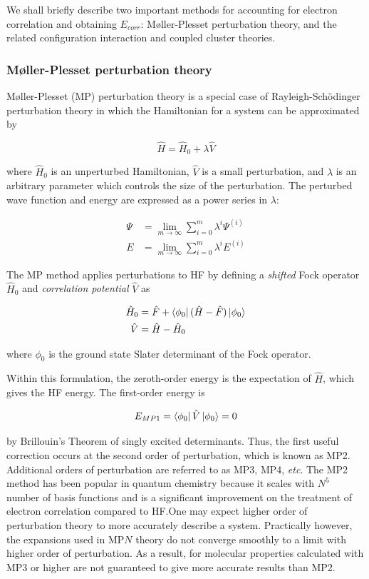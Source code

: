 We shall briefly describe two important methods for accounting for electron correlation and obtaining $E_{corr}$: M{\o}ller-Plesset perturbation theory, and the related configuration interaction and coupled cluster theories.

\subsubsection{M{\o}ller-Plesset perturbation theory}

M{\o}ller-Plesset (MP) perturbation theory is a special case of Rayleigh-Sch{\"o}dinger perturbation theory in which the Hamiltonian for a system can be approximated by

\begin{equation}
  \hat{H} = \hat{H}_0 + \lambda\hat{V}
\end{equation}

\noindent where $\hat{H}_0$ is an unperturbed Hamiltonian, $\hat{V}$ is a small perturbation, and $\lambda$ is an arbitrary parameter which controls the size of the perturbation. The perturbed wave function and energy are expressed as a power series in $\lambda$:

\begin{align}
 \Psi &= \lim_{m\to\infty} \sum_{i=0}^{m} \lambda^i \Psi^{(i)} \\
  E &= \lim_{m\to\infty} \sum_{i=0}^{m} \lambda^i E^{(i)}
\end{align}

The MP method applies perturbations to HF by defining a \emph{shifted} Fock operator $\hat{H}_0$ and \emph{correlation potential} $\hat{V}$ as

\begin{align}
  \hat{H}_0 &= \hat{F} + \bra{\phi_0}(\hat{H}-\hat{F})\ket{\phi_0} \\
  \hat{V}   &= \hat{H} - \hat{H}_0
\end{align}

\noindent where $\phi_0$ is the ground state Slater determinant of the Fock operator.

Within this formulation, the zeroth-order energy is the expectation of $\hat{H}$, which gives the HF energy. The first-order energy is

\begin{equation}
  E_{MP1} = \bra{\phi_0}\hat{V}\ket{\phi_0} = 0
\end{equation}

\noindent by Brillouin's Theorem of singly excited determinants. Thus, the first useful correction occurs at the second order of perturbation, which is known as MP2. Additional orders of perturbation are referred to as MP3, MP4, \emph{etc}. The MP2 method has been popular in quantum chemistry because it scales with $N^5$ number of basis functions and is a significant improvement on the treatment of electron correlation compared to HF.\@ One may expect higher order of perturbation theory to more accurately describe a system. Practically however, the expansions used in MP$N$ theory do not converge smoothly to a limit with higher order of perturbation.\cite{Leininger2000} As a result, for molecular properties calculated with MP3 or higher are not guaranteed to give more accurate results than MP2.

